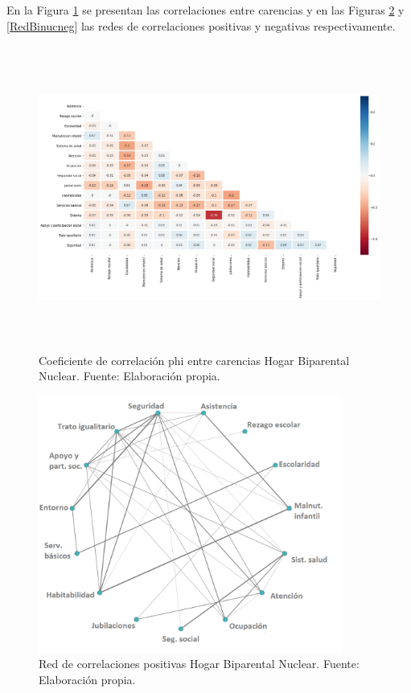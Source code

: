 \documentclass[12pt,letterpaper,spanish]{article}
\begin{document}
En la Figura \ref{HMBinuc} se presentan las correlaciones entre carencias y en las Figuras \ref{RedBinucpos} y \ref{RedBinucneg} las redes de correlaciones positivas y negativas respectivamente.
\begin{figure}[H]
    \centering
    \includegraphics[height=10cm]{Heatmaps/Heatmap_pearson_car_binuc.png}
    \caption{Coeficiente de correlación phi entre carencias Hogar Biparental Nuclear. Fuente: Elaboración propia.}
    \label{HMBinuc}
\end{figure}

\begin{figure}[H]
  \centering
    \includegraphics[width=10cm]{Grafos/grafo_binuc_pos.png}
    \caption{Red de correlaciones positivas Hogar Biparental Nuclear. Fuente: Elaboración propia.}
    \label{RedBinucpos}
\end{figure}
\end{document}
